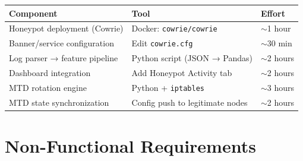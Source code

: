 \documentclass[12pt,a4paper]{article}
\begin{document}
\begin{table}[h!]
\centering
\small
\begin{tabular}{L{5cm} L{5cm} C{3cm}}
  \toprule
  \textbf{Component} & \textbf{Tool} & \textbf{Effort} \\
  \midrule
  Honeypot deployment (Cowrie)     & Docker: \texttt{cowrie/cowrie}         & $\sim$1 hour \\
  Banner/service configuration     & Edit \texttt{cowrie.cfg}               & $\sim$30 min \\
  Log parser → feature pipeline    & Python script (JSON → Pandas)          & $\sim$2 hours \\
  Dashboard integration            & Add Honeypot Activity tab              & $\sim$2 hours \\
  MTD rotation engine              & Python + \texttt{iptables}             & $\sim$3 hours \\
  MTD state synchronization        & Config push to legitimate nodes        & $\sim$2 hours \\
  \bottomrule
\end{tabular}
\end{table}


\section{Non-Functional Requirements}
\end{document}
